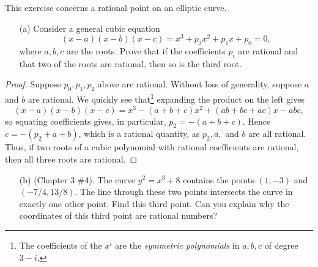 \documentclass{article}
\begin{document}
\begin{exercise}
This exercise concerns a rational point on an elliptic curve.
\begin{itemize}
    \item[(a)] Consider a general cubic equation
    $$(x-a)(x-b)(x-c) = x^3+p_2x^2+p_1x + p_0 = 0,$$
    where $a,b,c$ are the roots. Prove that if the coefficients $p_i$ are rational and that two of the roots are rational, then so is the third root.
\end{itemize}
\begin{proof}
Suppose $p_0, p_1, p_2$ above are rational. Without loss of generality, suppose $a$ and $b$ are rational. We quickly see that\footnote{The coefficients of the $x^i$ are the \textit{symmetric polynomials} in $a,b,c$ of degree $3-i$.} expanding the product on the left gives
$$(x-a)(x-b)(x-c) = x^3-(a+b+c)x^2 + (ab + bc + ac)x - abc,$$
so equating coefficients gives, in particular, $p_2 = -(a+b+c)$. Hence $c = -(p_2+a+b)$, which is a rational quantity, as $p_2, a,$ and $b$ are all rational. Thus, if two roots of a cubic polynomial with rational coefficients are rational, then all three roots are rational.
\end{proof}
\newpage

\begin{itemize}
    \item[(b)] (Chapter 3 \#4). The curve $y^2=x^3 + 8$ contains the points $(1, -3)$ and $(-7/4, 13/8)$. The line through these two points intersects the curve in exactly one other point. Find this third point. Can you explain why the coordinates of this third point are rational numbers?
\end{itemize}


\end{exercise}
\end{document}

